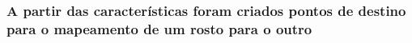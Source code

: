 \documentclass{beamer}
\begin{document}
\begin{frame}
\frametitle{A partir das características foram criados pontos de destino para o mapeamento de um rosto para o outro}

\begin{figure}[h]
\centering
{}
\end{figure}

\end{frame}

\end{document}
